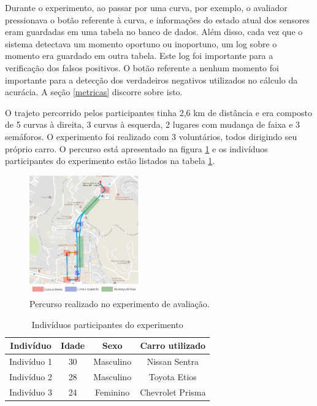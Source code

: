 Durante o experimento, ao passar por uma curva, por exemplo, o avaliador pressionava o botão
referente à curva, e informações do estado atual dos sensores eram guardadas em uma tabela no banco de dados.
Além disso, cada vez que o sistema detectava um momento oportuno ou inoportuno, um log sobre o
momento era guardado em outra tabela. Este log foi importante para a verificação dos falsos positivos.
O botão referente a nenhum momento foi importante para a detecção dos verdadeiros negativos utilizados
no cálculo da acurácia. A seção \ref{metricas} discorre sobre isto.

O trajeto percorrido pelos participantes tinha 2,6 km de distância e era composto de 5 curvas à direita,
3 curvas à esquerda, 2 lugares com mudança de faixa e 3 semáforos. O experimento foi realizado com 3
voluntários, todos dirigindo seu próprio carro. O percurso está apresentado na figura \ref{percurso} e os
indivíduos participantes do experimento estão listados na tabela \ref{participantes}.

\begin{figure}[H]
\centering
\includegraphics[width=0.42\textwidth]{images/percurso.png}
\caption{Percurso realizado no experimento de avaliação.}
\label{percurso}
\end{figure}

\begin{table}[h]
\centering
\caption{Indivíduos participantes do experimento}
\label{participantes}
\begin{tabular}{|c|c|c|c|}
\hline
\textbf{Indivíduo} & \textbf{Idade} & \textbf{Sexo} & \textbf{Carro utilizado} \\ \hline
Indivíduo 1        & 30             & Masculino     & Nissan Sentra            \\ \hline
Indivíduo 2        & 28             & Masculino     & Toyota Etios             \\ \hline
Indivíduo 3        & 24             & Feminino      & Chevrolet Prisma         \\ \hline
\end{tabular}
\end{table}

